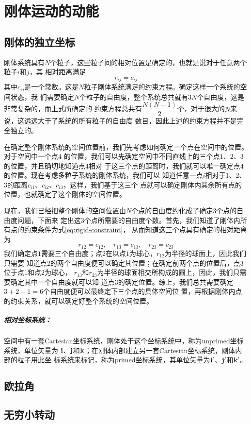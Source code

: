 \chapter{刚体运动的动能}

\section{刚体的独立坐标}

刚体系统具有$N$个粒子，这些粒子间的相对位置是确定的，也就是说对于任意两个粒子$i$和$j$，其
相对距离满足
\begin{equation}
	r_{ij} = c_{ij}	\label{eq:rigid-constraint}
\end{equation} 
其中$c_{ij}$是一个常数。这是$N$粒子刚体系统满足的约束方程。确定这样一个系统的空间状态，我
们需要确定$N$个粒子的自由度，整个系统总共就有$3N$个自由度，这是非常复杂的，而上式所确定的
约束方程总共有$\dfrac{N(N-1)}{2}$个，对于很大的$N$来说，这远远大于了系统的所有粒子的自由度
数目，因此上述的约束方程并不是完全独立的。

在确定整个刚体系统的空间位置前，我们先考虑如何确定一个点在空间中的位置。对于空间中一个点$4$
的位置，我们可以先确定空间中不同直线上的三个点$1$、$2$、$3$的位置，并且确切地知道点$4$相对
于这三个点的距离时，我们就可以唯一确定点$4$的位置。现在考虑多粒子系统的刚体系统，我们可以
知道任意一点$i$相对于$1$、$2$、$3$的距离$c_{i1}$、$c_{i2}$、$c_{i3}$，这样，我们基于这三个
点就可以确定刚体内其余所有点的位置，也就确定了这个刚体的空间位置。

现在，我们已经把整个刚体的空间位置由$N$个点的自由度约化成了确定$3$个点的自由度问题，下面来
定出这$3$个点所需要的自由度个数。首先，我们知道了刚体内所有点的约束条件为式\eqref{eq:rigid-constraint}，
从而知道这三个点具有确定的相对距离为
\begin{equation*}
	r_{12} = c_{12}, \quad r_{13} = c_{13}, \quad r_{23} = c_{23}
\end{equation*} 
我们确定点$1$需要三个自由度；点$2$在以点$1$为球心，$r_{12}$为半径的球面上，因此我们只需要
知道点$2$的两个自由度便可以确定其位置；在确定前两个点的位置后，点$3$位于点$1$和点$2$为球心，
$r_{13}$和$r_{23}$为半径的球面相交所构成的圆上，因此，我们只需要确定其中一个自由度就可以知
道点$3$的确定位置。综上，我们总共需要确定$3+2+1=6$个自由度便可以最终定下三个点的具体空间位
置，再根据刚体内点的约束关系，就可以确定好整个系统的空间位置。

\paragraph*{相对坐标系统：}
空间中有一套Cartesian坐标系统，刚体处于这个坐标系统中，称为unprimed坐标系统，单位矢量为
$\bf{i}$、$\bf{j}$和$\bf{k}$；在刚体内部建立另一套Cartesian坐标系统，刚体内部的粒子用此坐
标系统来标记，称为primed坐标系统，其单位矢量为$\bf{i}^{\prime}$、$\bf{j}^{\prime}$和$\bf{k}^{\prime}$。

\section{欧拉角}


\section{无穷小转动}
